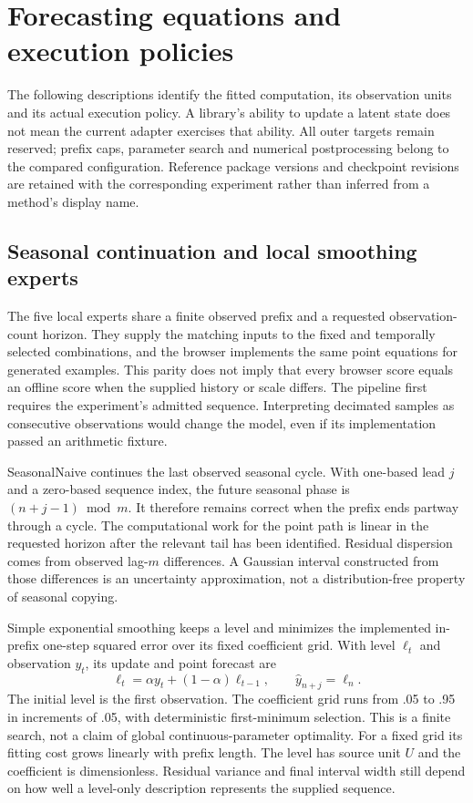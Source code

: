 \section{Forecasting equations and execution policies}
\label{sec:forecast-methods}

The following descriptions identify the fitted computation, its observation units and its actual execution policy. A library's ability to update a latent state does not mean the current adapter exercises that ability. All outer targets remain reserved; prefix caps, parameter search and numerical postprocessing belong to the compared configuration. Reference package versions and checkpoint revisions are retained with the corresponding experiment rather than inferred from a method's display name.

\subsection{Seasonal continuation and local smoothing experts}
\label{sec:method-local-experts}
The five local experts share a finite observed prefix and a requested observation-count horizon. They supply the matching inputs to the fixed and temporally selected combinations, and the browser implements the same point equations for generated examples. This parity does not imply that every browser score equals an offline score when the supplied history or scale differs. The pipeline first requires the experiment's admitted sequence. Interpreting decimated samples as consecutive observations would change the model, even if its implementation passed an arithmetic fixture.

SeasonalNaive continues the last observed seasonal cycle. With one-based lead $j$ and a zero-based sequence index, the future seasonal phase is $(n+j-1)\bmod m$. It therefore remains correct when the prefix ends partway through a cycle. The computational work for the point path is linear in the requested horizon after the relevant tail has been identified. Residual dispersion comes from observed lag-$m$ differences. A Gaussian interval constructed from those differences is an uncertainty approximation, not a distribution-free property of seasonal copying.

Simple exponential smoothing keeps a level and minimizes the implemented in-prefix one-step squared error over its fixed coefficient grid. With level $\ell_t$ and observation $y_t$, its update and point forecast are
\begin{equation}\label{eq:report-ses}
\ell_t=\alpha y_t+(1-\alpha)\ell_{t-1},\qquad \widehat y_{n+j}=\ell_n.
\end{equation}
The initial level is the first observation. The coefficient grid runs from .05 to .95 in increments of .05, with deterministic first-minimum selection. This is a finite search, not a claim of global continuous-parameter optimality. For a fixed grid its fitting cost grows linearly with prefix length. The level has source unit $U$ and the coefficient is dimensionless. Residual variance and final interval width still depend on how well a level-only description represents the supplied sequence.

